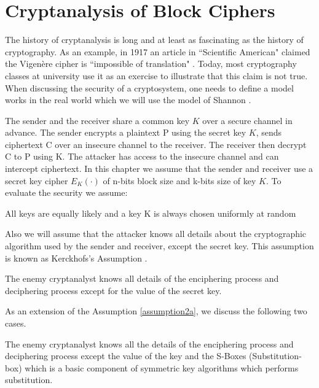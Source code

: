 \chapter{Cryptanalysis of Block Ciphers} \label{ch:CoBC}
\label{Cryptanalysis of block ciphers}
%
The history of cryptanalysis is long and at least as fascinating as the history of cryptography. As an example, in 1917 an article in ``Scientific American" claimed the Vigen\`{e}re cipher is ``impossible of translation" \cite{knudsen1998block}. Today, most cryptography classes at university use it as an exercise to illustrate that this claim is not true. When discussing the security of a cryptosystem, one needs to define a model works in the real world which we will use the model of Shannon \cite{shannon1949communication}.


The sender and the receiver share a common key $K$ over a secure channel in advance. The sender encrypts a plaintext P using the secret key $K$, sends ciphertext C over an insecure channel to the receiver. The receiver then decrypt C to P using K. The attacker has access to the insecure channel and can intercept ciphertext. In this chapter we assume that the sender and receiver use a secret key cipher $E_{K}(\cdot)$ of n-bits block size and k-bits size of key $K$. To evaluate the security we assume:

\begin{myAssumption}
	All keys are equally likely and a key K is always chosen uniformly at random
\end{myAssumption}
Also we will assume that the attacker knows all details about the cryptographic algorithm used by the sender and receiver, except the secret key. This assumption is known as Kerckhofs's Assumption \cite{kahn1996codebreakers}.
\begin{myAssumption} \label{assumption2a}
	The enemy cryptanalyst knows all details of the enciphering process and deciphering process except for the value of the secret key.
\end{myAssumption}

As an extension of the Assumption \ref{assumption2a}, we discuss the following two cases. 
\begin{myAssumption} \label{assumption2b}
	The enemy cryptanalyst knows all the details of the enciphering process and deciphering process except the value of the key and the S-Boxes (Substitution-box) which is a basic component of symmetric key algorithms which performs substitution.
\end{myAssumption}

